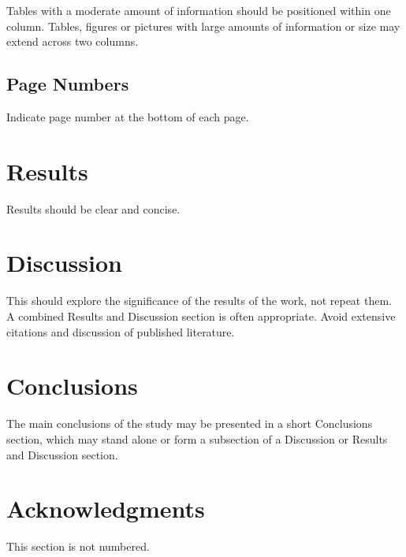\documentclass[]{iac}
\begin{document}
Tables with a moderate amount of information should be positioned within one column. Tables, figures or pictures with large amounts of information or size may extend across two columns.

\subsection{Page Numbers}
Indicate page number at the bottom of each page.

\section{Results}
Results should be clear and concise.

\section{Discussion}
This should explore the significance of the results of the work, not repeat them. A combined Results and Discussion section is often appropriate. Avoid extensive citations and discussion of published literature.

\section{Conclusions}
The main conclusions of the study may be presented in a short Conclusions section, which may stand alone or form a subsection of a Discussion or Results and Discussion section.

\section*{Acknowledgments}
This section is not numbered. 

\printbibliography
\end{document}
